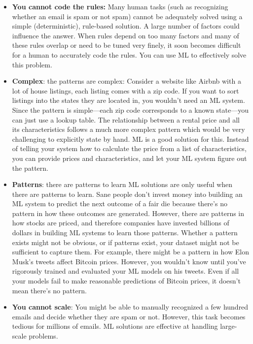 \documentclass[openany]{book}
\begin{document}
\begin{itemize}
    \item \textbf{You cannot code the rules:} Many human tasks (such as recognizing whether an email is spam or not spam) cannot be adequately solved using a simple (deterministic), rule-based solution. A large number of factors could influence the answer. When rules depend on too many factors and many of these rules overlap or need to be tuned very finely, it soon becomes difficult for a human to accurately code the rules. You can use ML to effectively solve this problem.

    \item \textbf{Complex}: the patterns are complex: Consider a website like Airbnb with a lot of house listings, each listing comes with a zip code. If you want to sort listings into the states they are located in, you wouldn’t need an ML system. Since the pattern is simple—each zip code corresponds to a known state—you can just use a lookup table. The relationship between a rental price and all its characteristics follows a much more complex pattern which would be very challenging to explicitly state by hand. ML is a good solution for this. Instead of telling your system how to calculate the price from a list of characteristics, you can provide prices and characteristics, and let your ML system figure out the pattern.


    \item \textbf{Patterns}: there are patterns to learn ML solutions are only useful when there are patterns to learn. Sane people don’t invest money into building an ML system to predict the next outcome of a fair die because there’s no pattern in how these outcomes are generated.
    However, there are patterns in how stocks are priced, and therefore companies have invested billions of dollars in building ML systems to learn those patterns.
    Whether a pattern exists might not be obvious, or if patterns exist, your dataset might not be sufficient to capture them. For example, there might be a pattern in how Elon Musk’s tweets affect Bitcoin prices. However, you wouldn’t know until you’ve rigorously trained and evaluated your ML models on his tweets. Even if all your models fail to make reasonable predictions of Bitcoin prices, it doesn’t mean there’s no pattern.

    
    \item \textbf{You cannot scale}: You might be able to manually recognized a few hundred emails and decide whether they are spam or not. However, this task becomes tedious for millions of emails. ML solutions are effective at handling large-scale problems. 


\end{itemize}
\end{document}

